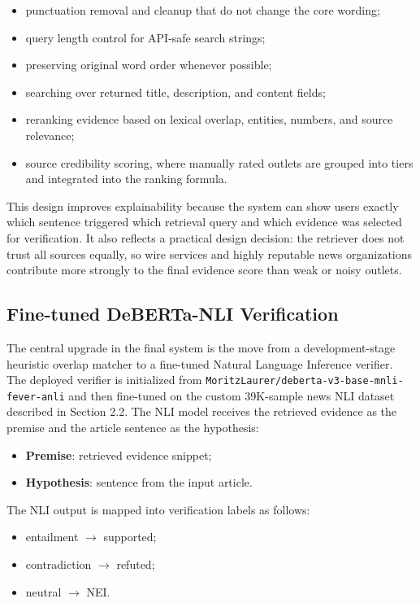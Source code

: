 \documentclass[11pt]{article}
\newcommand{\code}[1]{\texttt{#1}}
\begin{document}
\begin{itemize}
    \item punctuation removal and cleanup that do not change the core wording;
    \item query length control for API-safe search strings;
    \item preserving original word order whenever possible;
    \item searching over returned title, description, and content fields;
    \item reranking evidence based on lexical overlap, entities, numbers, and
    source relevance;
    \item source credibility scoring, where manually rated outlets are grouped
    into tiers and integrated into the ranking formula.
\end{itemize}

This design improves explainability because the system can show users exactly
which sentence triggered which retrieval query and which evidence was selected
for verification. It also reflects a practical design decision: the retriever
does not trust all sources equally, so wire services and highly reputable news
organizations contribute more strongly to the final evidence score than weak or
noisy outlets.

\subsection{Fine-tuned DeBERTa-NLI Verification}

The central upgrade in the final system is the move from a development-stage
heuristic overlap matcher to a fine-tuned Natural Language Inference verifier.
The deployed verifier is initialized from
\code{MoritzLaurer/deberta-v3-base-mnli-fever-anli} and then fine-tuned on the
custom 39K-sample news NLI dataset described in Section 2.2. The NLI model
receives the retrieved evidence as the premise and the article sentence as the
hypothesis:

\begin{itemize}
    \item \textbf{Premise}: retrieved evidence snippet;
    \item \textbf{Hypothesis}: sentence from the input article.
\end{itemize}

The NLI output is mapped into verification labels as follows:

\begin{itemize}
    \item entailment $\rightarrow$ supported;
    \item contradiction $\rightarrow$ refuted;
    \item neutral $\rightarrow$ NEI.
\end{itemize}
\end{document}
